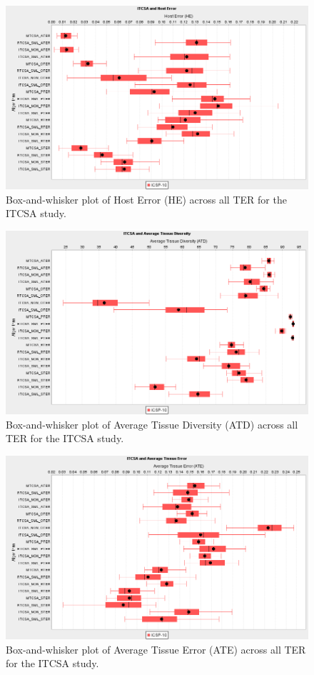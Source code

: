 \begin{figure}[htp]
	\centering
		\includegraphics[scale=0.80]{Tissues/ITCSA-HE}
	\caption{Box-and-whisker plot of Host Error (HE) across all TER for the ITCSA study.}
	\label{fig:tissues:itcsa:he:boxplot}
\end{figure}

\begin{figure}[htp]
	\centering
		\includegraphics[scale=0.80]{Tissues/ITCSA-ATD}
	\caption{Box-and-whisker plot of Average Tissue Diversity (ATD) across all TER for the ITCSA study.}
	\label{fig:tissues:itcsa:atd:boxplot}
\end{figure}

\begin{figure}[htp]
	\centering
		\includegraphics[scale=0.80]{Tissues/ITCSA-ATE}
	\caption{Box-and-whisker plot of Average Tissue Error (ATE) across all TER for the ITCSA study.}
	\label{fig:tissues:itcsa:ate:boxplot}
\end{figure}

